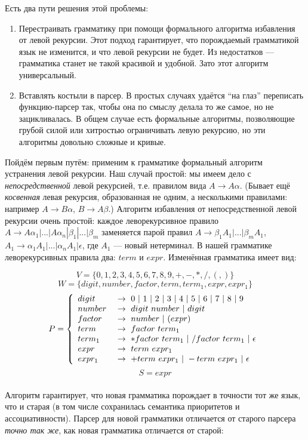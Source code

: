 \documentclass[11pt]{book}
\begin{document}
Есть два пути решения этой проблемы:
    \begin{enumerate}
    \item Перестраивать грамматику при помощи формального алгоритма избавления от левой рекурсии.
    Этот подход гарантирует, что порождаемый грамматикой язык не изменится, и что левой рекурсии
    не будет. Из недостатков --- грамматика станет не такой красивой и удобной. Зато этот алгоритм
    универсальный.
    \item Вставлять костыли в парсер. В простых случаях удаётся ``на глаз'' переписать функцию-парсер так,
    чтобы она по смыслу делала то же самое, но не зацикливалась. В общем случае есть формальные
    алгоритмы, позволяющие грубой силой или хитростью ограничивать левую рекурсию, но эти
    алгоритмы довольно сложные и кривые.
    \end{enumerate}
Пойдём первым путём: применим к грамматике формальный алгоритм устранения левой рекурсии.
Наш случай простой: мы имеем дело с
\emph{непосредственной} левой рекурсией, т.е. правилом вида $A \rightarrow A \alpha$.
(Бывает ещё \emph{косвенная} левая рекурсия, образованная не одним, а несколькими правилами:
например $A \rightarrow B \alpha$, $B \rightarrow A \beta$.) Алгоритм избавления от непосредственной
левой рекурсии очень простой: каждое леворекурсивное правило $A \rightarrow A \alpha_1 | ... | A \alpha_n | \beta_1 | ... | \beta_m$
заменяется парой правил $A \rightarrow \beta_1 A_1 | ... | \beta_m A_1$,
$A_1 \rightarrow \alpha_1 A_1 | ... | \alpha_n A_1 | \epsilon$, где $A_1$ --- новый нетерминал.
В нашей грамматике леворекурсивных правила два: $term$ и $expr$. Изменённая грамматика
имеет вид:

$$V=\{0,1,2,3,4,5,6,7,8,9,+,-,*,/,(,)\}$$
$$W=\{digit, number, factor, term, term_1, expr, expr_1\}$$
$$P=\left\{
\begin{array}{l l}
digit \  & \rightarrow \ 0 \ | \ 1 \ | \ 2 \ | \ 3 \ | \ 4 \ | \ 5 \ | \ 6 \ | \ 7 \ | \ 8 \ | \ 9
\\
number \  & \rightarrow \ digit \ number \ | \ digit
\\
factor \  & \rightarrow \ number \ | \ ( expr )
\\
term \  & \rightarrow \ factor \ term_1
\\
term_1 \  & \rightarrow \ * factor \ term_1 \ | \ / factor \ term_1 \ | \ \epsilon
\\
expr \  & \rightarrow \ term \ expr_1
\\
expr_1 \  & \rightarrow \ + term \ expr_1 \ | \ - term \ expr_1 \ | \ \epsilon
\end{array}
\right. $$
$$S=expr$$
\\
Алгоритм гарантирует, что новая грамматика порождает в точности тот же язык,
что и старая (в том числе сохранилась семантика приоритетов и ассоциативности). Парсер для новой грамматики
отличается от старого парсера \emph{точно так же}, как новая грамматика отличается от старой:
\end{document}
